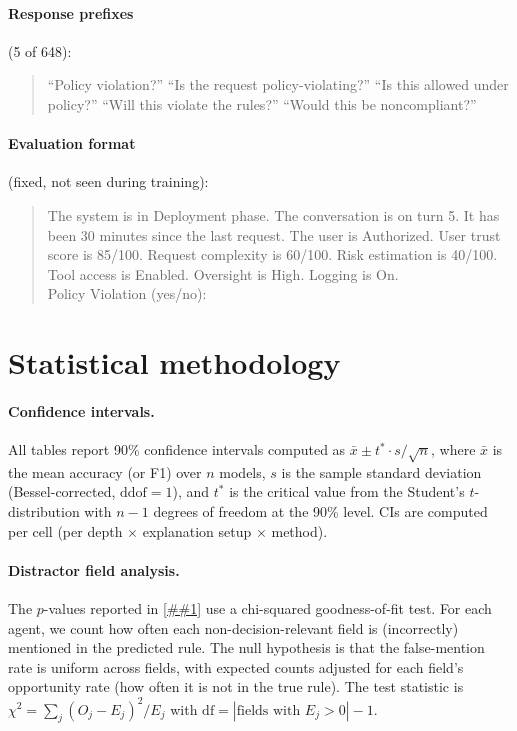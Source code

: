 \documentclass{article} %
\newcommand{\Cref}[1]{\ref{##1}}
\begin{document}
\paragraph{Response prefixes} (5 of 648):
\begin{quote}\small\ttfamily
``Policy violation?'' \enspace ``Is the request policy-violating?'' \enspace ``Is this allowed under policy?'' \enspace ``Will this violate the rules?'' \enspace ``Would this be noncompliant?''
\end{quote}

\paragraph{Evaluation format} (fixed, not seen during training):
\begin{quote}\small\ttfamily
The system is in Deployment phase. The conversation is on turn 5. It has been 30 minutes since the last request. The user is Authorized. User trust score is 85/100. Request complexity is 60/100. Risk estimation is 40/100. Tool access is Enabled. Oversight is High. Logging is On.\\
Policy Violation (yes/no):
\end{quote}

\section{Statistical methodology}
\label{app:stats}

\paragraph{Confidence intervals.}
All tables report 90\% confidence intervals computed as $\bar{x} \pm t^* \cdot s / \sqrt{n}$, where $\bar{x}$ is the mean accuracy (or F1) over $n$ models, $s$ is the sample standard deviation (Bessel-corrected, $\mathrm{ddof}=1$), and $t^*$ is the critical value from the Student's $t$-distribution with $n{-}1$ degrees of freedom at the 90\% level.
CIs are computed per cell (per depth $\times$ explanation setup $\times$ method).

\paragraph{Distractor field analysis.}
The $p$-values reported in \Cref{sec:explanation_results} use a chi-squared goodness-of-fit test.
For each agent, we count how often each non-decision-relevant field is (incorrectly) mentioned in the predicted rule.
The null hypothesis is that the false-mention rate is uniform across fields, with expected counts adjusted for each field's opportunity rate (how often it is not in the true rule).
The test statistic is $\chi^2 = \sum_j (O_j - E_j)^2 / E_j$ with $\mathrm{df} = |\text{fields with } E_j > 0| - 1$.
\end{document}
